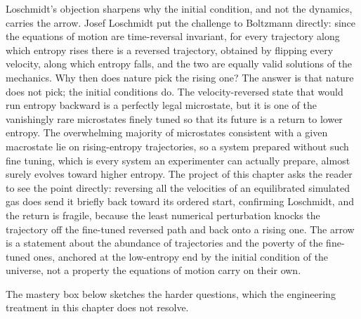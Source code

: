 Loschmidt's objection sharpens why the initial condition, and not the dynamics,
carries the arrow. Josef Loschmidt put the challenge to Boltzmann directly: since
the equations of motion are time-reversal invariant, for every trajectory along
which entropy rises there is a reversed trajectory, obtained by flipping every
velocity, along which entropy falls, and the two are equally valid solutions of
the mechanics. Why then does nature pick the rising one? The answer is that
nature does not pick; the initial conditions do. The velocity-reversed state that
would run entropy backward is a perfectly legal microstate, but it is one of the
vanishingly rare microstates finely tuned so that its future is a return to lower
entropy. The overwhelming majority of microstates consistent with a given
macrostate lie on rising-entropy trajectories, so a system prepared without such
fine tuning, which is every system an experimenter can actually prepare, almost
surely evolves toward higher entropy. The project of this chapter asks the reader
to see the point directly: reversing all the velocities of an equilibrated
simulated gas does send it briefly back toward its ordered start, confirming
Loschmidt, and the return is fragile, because the least numerical perturbation
knocks the trajectory off the fine-tuned reversed path and back onto a rising one.
The arrow is a statement about the abundance of trajectories and the poverty of
the fine-tuned ones, anchored at the low-entropy end by the initial condition of
the universe, not a property the equations of motion carry on their own.

The mastery box below sketches the harder questions, which the
engineering treatment in this chapter does not resolve.

